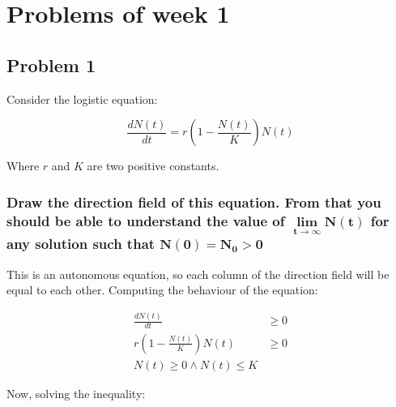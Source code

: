\graphicspath{{chapters/ex1/images}}
\chapter{Problems of week 1}

\section{Problem 1}
Consider the logistic equation:

$$\frac{dN(t)}{dt} = r\left(1-\frac{N(t)}{K}\right)N(t)$$

Where $r$ and $K$ are two positive constants.

  \subsection{Draw the direction field of this equation. From that you should be able to understand the value of $\mathbf{\lim\limits_{t\to\infty}N(t)}$ for any solution such that $\mathbf{N(0) = N_0>0}$}
  This is an autonomous equation, so each column of the direction field will be equal to each other.
  Computing the behaviour of the equation:

  \begin{align*}
    \frac{dN(t)}{dt} &\ge 0\\
    r\left(1-\frac{N(t)}{K}\right)N(t) &\ge 0\\
    N(t)\ge 0\land N(t)\le K
  \end{align*}

  Now, solving the inequality:

  \begin{figure}[H]
    \centering
  \end{figure}

